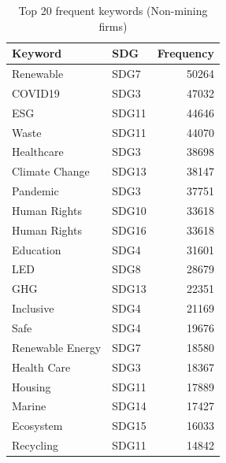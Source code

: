 \begin{table}

\caption{Top 20 frequent keywords (Non-mining firms)}
\centering
\begin{tabular}[t]{llr}
\toprule
Keyword & SDG & Frequency\\
\midrule
Renewable & SDG7 & 50264\\
COVID19 & SDG3 & 47032\\
ESG & SDG11 & 44646\\
Waste & SDG11 & 44070\\
Healthcare & SDG3 & 38698\\
\addlinespace
Climate Change & SDG13 & 38147\\
Pandemic & SDG3 & 37751\\
Human Rights & SDG10 & 33618\\
Human Rights & SDG16 & 33618\\
Education & SDG4 & 31601\\
\addlinespace
LED & SDG8 & 28679\\
GHG & SDG13 & 22351\\
Inclusive & SDG4 & 21169\\
Safe & SDG4 & 19676\\
Renewable Energy & SDG7 & 18580\\
\addlinespace
Health Care & SDG3 & 18367\\
Housing & SDG11 & 17889\\
Marine & SDG14 & 17427\\
Ecosystem & SDG15 & 16033\\
Recycling & SDG11 & 14842\\
\bottomrule
\end{tabular}
\end{table}
